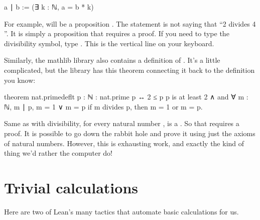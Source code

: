 \documentclass[letterpaper,10pt,english]{sphinxmanual}
\begin{document}
\begin{sphinxVerbatim}[commandchars=\\\{\}]
a ∣ b := (∃ k : ℕ, a = b * k)
\end{sphinxVerbatim}

\sphinxAtStartPar
For example,  will be a proposition .
 The statement  is not saying that “2 divides 4 ”.
It is simply a proposition that requires a proof.
 If you need to type the divisibility symbol, type .
This is  the vertical line on your keyboard.

\sphinxAtStartPar
Similarly, the mathlib library also contains a definition of .
It’s a little complicated, but the library has this theorem connecting it back to the definition you know:

\begin{sphinxVerbatim}[commandchars=\\\{\}]
theorem nat.prime\PYGZus{}def\PYGZus{}lt\PYGZsq{}\PYGZsq{} \PYGZob{}p : ℕ\PYGZcb{} :
  nat.prime p ↔
    2 ≤ p                                     \PYGZhy{}\PYGZhy{} p is at least 2
    ∧                                         \PYGZhy{}\PYGZhy{} and
    ∀ \PYGZob{}m : ℕ\PYGZcb{}, m ∣ p, m = 1 ∨ m = p           \PYGZhy{}\PYGZhy{} if m divides p, then m = 1 or m = p.
\end{sphinxVerbatim}

\sphinxAtStartPar
Same as with divisibility, for every natural number ,
 is a .
So that  requires a proof.
It is possible to go down the rabbit hole and prove it using just the axioms of natural numbers.
However, this is exhausting work, and exactly the kind of thing we’d rather the computer do!


\section{Trivial calculations}
\label{\detokenize{day3:trivial-calculations}}
\sphinxAtStartPar
Here are two of Lean’s many tactics that automate basic calculations for us.
\end{document}
